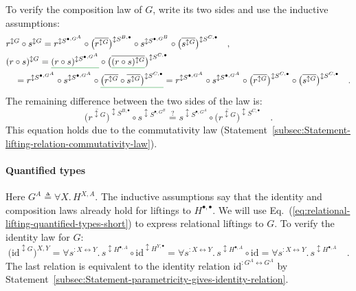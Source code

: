 To verify the composition law of $G$, write its two sides and use
the inductive assumptions:
\begin{align*}
 & r^{\updownarrow G}\circ s^{\updownarrow G}=r^{\updownarrow S^{\bullet,G^{A}}}\circ\big(\overline{r^{\updownarrow G}}\big)^{\updownarrow S^{B,\bullet}}\circ s^{\updownarrow S^{\bullet,G^{B}}}\circ\big(\overline{s^{\updownarrow G}}\big)^{\updownarrow S^{C,\bullet}}\quad,\\
 & (r\circ s)^{\updownarrow G}=\gunderline{(r\circ s)^{\updownarrow S^{\bullet,G^{A}}}}\circ\big(\overline{\gunderline{(r\circ s)^{\updownarrow G}}}\big)^{\updownarrow S^{C,\bullet}}\\
 & \quad=r^{\updownarrow S^{\bullet,G^{A}}}\circ s^{\updownarrow S^{\bullet,G^{A}}}\circ\gunderline{\big(\overline{r^{\updownarrow G}}\circ\overline{s^{\updownarrow G}}\big)^{\updownarrow S^{C,\bullet}}}=r^{\updownarrow S^{\bullet,G^{A}}}\circ s^{\updownarrow S^{\bullet,G^{A}}}\circ\big(\overline{r^{\updownarrow G}}\big)^{\updownarrow S^{C,\bullet}}\circ\big(\overline{s^{\updownarrow G}}\big)^{\updownarrow S^{C,\bullet}}\quad.
\end{align*}
The remaining difference between the two sides of the law is:
\[
\big(\overline{r^{\updownarrow G}}\big)^{\updownarrow S^{B,\bullet}}\circ s^{\updownarrow S^{\bullet,G^{B}}}\overset{?}{=}s^{\updownarrow S^{\bullet,G^{A}}}\circ\big(\overline{r^{\updownarrow G}}\big)^{\updownarrow S^{C,\bullet}}\quad.
\]
This equation holds due to the commutativity law (Statement~\ref{subsec:Statement-lifting-relation-commutativity-law}).

\paragraph{Quantified types}

Here $G^{A}\triangleq\forall X.\,H^{X,A}$. The inductive assumptions
say that the identity and composition laws already hold for liftings
to $H^{\bullet,\bullet}$. We will use Eq.~(\ref{eq:relational-lifting-quantified-types-short})
to express relational liftings to $G$. To verify the identity law
for $G$:
\[
\big(\text{id}^{\updownarrow G}\big)^{X,Y}=\forall s^{:X\leftrightarrow Y}.\,s^{\updownarrow H^{\bullet,A}}\circ\text{id}^{\updownarrow H^{Y,\bullet}}=\forall s^{:X\leftrightarrow Y}.\,s^{\updownarrow H^{\bullet,A}}\circ\text{id}=\forall s^{:X\leftrightarrow Y}.\,s^{\updownarrow H^{\bullet,A}}\quad.
\]
The last relation is equivalent to the identity relation $\text{id}^{:G^{A}\leftrightarrow G^{A}}$
by Statement~\ref{subsec:Statement-parametricity-gives-identity-relation}.

